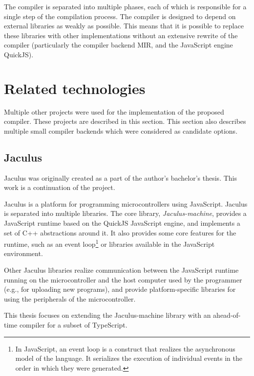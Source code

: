 The compiler is separated into multiple phases, each of which is responsible for a single step of the compilation process. The compiler is designed to depend on external libraries as weakly as possible. This means that it is possible to replace these libraries with other implementations without an extensive rewrite of the compiler (particularly the compiler backend MIR, and the JavaScript engine QuickJS).



\section{Related technologies}

Multiple other projects were used for the implementation of the proposed compiler. These projects are described in this section. This section also describes multiple small compiler backends which were considered as candidate options.

\subsection{Jaculus}\label{jaculus}

Jaculus was originally created as a part of the author's bachelor's thesis\cite{jaculusthesis}. This work is a continuation of the project.

Jaculus is a platform for programming microcontrollers using JavaScript. Jaculus is separated into multiple libraries. The core library, \textit{Jaculus-machine}, provides a JavaScript runtime based on the QuickJS JavaScript engine\cite{quickjs}, and implements a set of C++ abstractions around it. It also provides some core features for the runtime, such as an event loop\footnote{In JavaScript, an event loop is a construct that realizes the asynchronous model of the language. It serializes the execution of individual events in the order in which they were generated.} or libraries available in the JavaScript environment.

Other Jaculus libraries realize communication between the JavaScript runtime running on the microcontroller and the host computer used by the programmer (e.g., for uploading new programs), and provide platform-specific libraries for using the peripherals of the microcontroller.

This thesis focuses on extending the Jaculus-machine library with an ahead-of-time compiler for a subset of TypeScript.


